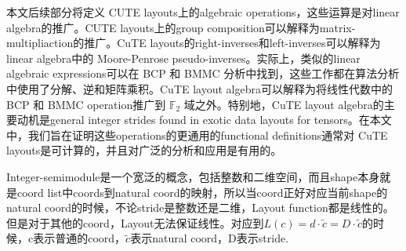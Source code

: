 \documentclass{article}
\begin{document}
本文后续部分将定义 CUTE layouts上的algebraic operations，这些运算是对linear algebra的推广。CUTE layouts上的group composition可以解释为matrix-multipliaction的推广。CuTE layouts的right-inverses和left-inverses可以解释为linear algebra中的 Moore-Penrose pseudo-inverses。实际上，类似的linear algebraic expressions可以在 BCP 和 BMMC 分析中找到，这些工作都在算法分析中使用了分解、逆和矩阵乘积。CuTE layout algebra可以解释为将线性代数中的 BCP 和 BMMC operation推广到 \( \mathbb{F}_2 \) 域之外。特别地，CuTE layout algebra的主要动机是general integer strides found in exotic data layouts for tensors。在本文中，我们旨在证明这些operations的更通用的functional definitions通常对 CuTE layouts是可计算的，并且对广泛的分析和应用是有用的。
\begin{mycomment}
    Integer-semimodule是一个宽泛的概念，包括整数和二维空间，而且shape本身就是coord list中coords到natural coord的映射，所以当coord正好对应当前shape的natural coord的时候，不论stride是整数还是二维，Layout function都是线性的。但是对于其他的coord，Layout无法保证线性。对应到\(L(c) = d \cdot \tilde{c} = D \cdot \tilde{c}\)的时候，c表示普通的coord，$\tilde{c}$表示natural coord，D表示stride.
\end{mycomment}
\end{document}
